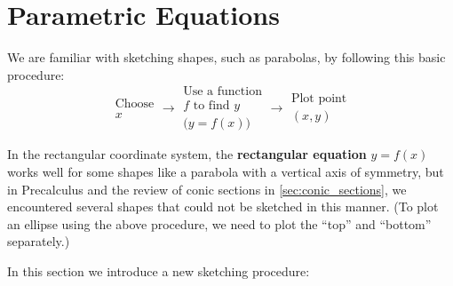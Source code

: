 \section{Parametric Equations}\label{sec:param_eqs}

We are familiar with sketching  shapes, such as parabolas, by following this basic procedure:
\[
\begin{gathered}\text{Choose}\\x\end{gathered}
\longrightarrow
\begin{gathered}
\text{Use a function}\\f\text{ to find }y\\\bigl(y=f(x)\bigr)
\end{gathered}
\longrightarrow
\begin{gathered}\text{Plot point}\\(x,y)\end{gathered}
\]

In the rectangular coordinate system, the \textbf{rectangular equation} $y=f(x)$ works well for some shapes like a parabola with a vertical axis of symmetry, but in Precalculus and the review of conic sections in \autoref{sec:conic_sections}, we encountered several shapes that could not be sketched in this manner. (To plot an ellipse using the above procedure, we need to plot the ``top'' and ``bottom'' separately.)

In this section we introduce a new sketching procedure:

